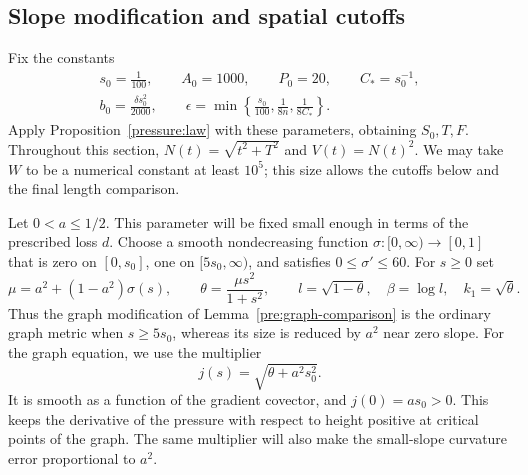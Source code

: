\subsection{Slope modification and spatial cutoffs}
\label{stretch:setup}

Fix the constants
\begin{equation}\label{stretch:constants}
 \begin{gathered}
 s_0=\frac1{100},\qquad A_0=1000,\qquad P_0=20,
 \qquad C_* =s_0^{-1},\\
 b_0=\frac{\delta s_0^2}{2000},\qquad
 \epsilon=\min\left\{\frac{s_0}{100},\frac1{8n},
                              \frac1{8C_*}\right\}.
 \end{gathered}
\end{equation}
Apply Proposition~\ref{pressure:law} with these parameters, obtaining
$S_0,T,F$.  Throughout this section,
$N(t)=\sqrt{t^2+T^2}$ and $V(t)=N(t)^2$.
We may take $W$ to be a numerical constant at least $10^5$; this size
allows the cutoffs below and the final length comparison.

Let $0<a\le1/2$.  This parameter will be fixed small enough in terms of
the prescribed loss $d$.  Choose a smooth nondecreasing function
$\sigma:[0,\infty)\to[0,1]$ that is zero on $[0,s_0]$, one on
$[5s_0,\infty)$, and satisfies $0\le\sigma'\le60$.  For $s\ge0$ set
\begin{equation}\label{stretch:slope-functions}
 \mu=a^2+(1-a^2)\sigma(s),\qquad
 \theta=\frac{\mu s^2}{1+s^2},\qquad
 l=\sqrt{1-\theta},\quad \beta=\log l,
 \quad k_1=\sqrt\theta.
\end{equation}
Thus the graph modification of Lemma~\ref{pre:graph-comparison} is the
ordinary graph metric when $s\ge5s_0$, whereas its size is reduced by
$a^2$ near zero slope.  For the graph equation, we use the multiplier
\[
 j(s)=\sqrt{\theta+a^2s_0^2}.
\]
It is smooth as a function of the gradient covector, and $j(0)=as_0>0$.
This keeps the derivative of the pressure with respect to height positive
at critical points of the graph.  The same multiplier will also make the
small-slope curvature error proportional to $a^2$.

